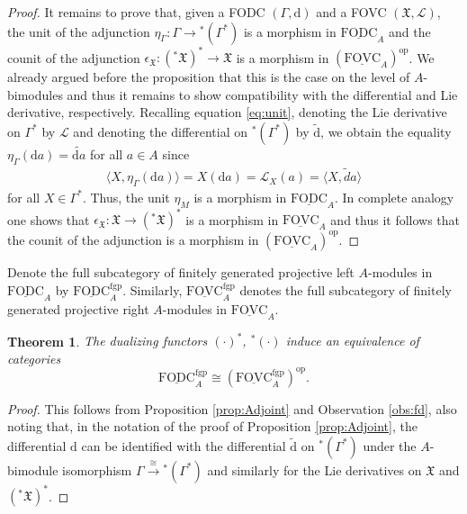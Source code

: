 \documentclass{article}
\newtheorem{theorem}[thm]{Theorem}
\theoremstyle{definition}
\newcommand{\fgp}{{\mathrm{fgp}}}
\begin{document}
\begin{proof}
		It remains to prove that, given a FODC $(\Gamma,\mathrm{d})$ and a FOVC $(\mathfrak{X},\mathscr{L})$, the unit of the adjunction $\eta_\Gamma\colon\Gamma\to{}^*(\Gamma^*)$ is a morphism in $\underline{\mathrm{FODC}}_A$ and the counit of the adjunction $\epsilon_\mathfrak{X}\colon({}^*\mathfrak{X})^*\to\mathfrak{X}$ is a morphism in $(\underline{\mathrm{FOVC}}_A)^\mathrm{op}$. We already argued before the proposition that this is the case on the level of $A$-bimodules and thus it remains to show compatibility with the differential and Lie derivative, respectively. Recalling equation \eqref{eq:unit}, denoting the Lie derivative on $\Gamma^*$ by $\mathscr{L}$ and denoting the differential on ${}^*(\Gamma^*)$ by $\tilde{\mathrm{d}}$, we obtain the equality $\eta_\Gamma(\mathrm{d}a)=\tilde{\mathrm{d}a}$ for all $a\in A$ since
		\begin{align*}
			\langle X,\eta_\Gamma(\mathrm{d}a)\rangle
			=X(\mathrm{d}a)
			=\mathscr{L}_X(a)
			=\langle X,\tilde{d}a\rangle
		\end{align*}
		for all $X\in\Gamma^*$. Thus, the unit $\eta_M$ is a morphism in $\underline{\mathrm{FODC}}_A$. In complete analogy one shows that $\epsilon_\mathfrak{X}\colon\mathfrak{X}\to({}^*\mathfrak{X})^*$ is a morphism in $\underline{\mathrm{FOVC}}_A$ and thus it follows that the counit of the adjunction is a morphism in $(\underline{\mathrm{FOVC}}_A)^\mathrm{op}$.
	\end{proof}
	
	
	Denote the full subcategory of finitely generated projective 
	left $A$-modules in $\underline{\mathrm{FODC}}_A$ by $\underline{\mathrm{FODC}}^{\fgp}_A$. Similarly, $\underline{\mathrm{FOVC}}^{\fgp}_A$ denotes the full subcategory of finitely generated projective
	right $A$-modules in $\underline{\mathrm{FOVC}}_A$.
	
	\begin{theorem}\label{dual-cp} 
		The dualizing functors $(\cdot)^*$, ${}^*(\cdot)$ induce an equivalence of categories
		$$
		\underline{\mathrm{FODC}}^{\fgp}_A\cong(\underline{\mathrm{FOVC}}^{\fgp}_A)^\mathrm{op}.
		$$
	\end{theorem}
	
	\begin{proof}
		This follows from Proposition \ref{prop:Adjoint} and Observation \ref{obs:fd}, 
		also noting that, in the notation of the proof of Proposition \ref{prop:Adjoint}, the differential $\mathrm{d}$ can be identified with the differential $\tilde{\mathrm{d}}$ on ${}^*(\Gamma^*)$ under the $A$-bimodule isomorphism $\Gamma\xrightarrow{\cong}{}^*(\Gamma^*)$ and similarly for the Lie derivatives on $\mathfrak{X}$ and $({}^*\mathfrak{X})^*$.
	\end{proof}
	
\end{document}

